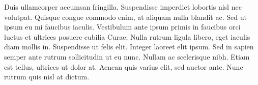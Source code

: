 \documentclass[11pt]{awe-homework}
\begin{document}
Duis ullamcorper accumsan fringilla. Suspendisse imperdiet lobortis nisl nec volutpat. Quisque congue commodo enim, at aliquam nulla blandit ac. Sed ut ipsum eu mi faucibus iaculis. Vestibulum ante ipsum primis in faucibus orci luctus et ultrices posuere cubilia Curae; Nulla rutrum ligula libero, eget iaculis diam mollis in. Suspendisse ut felis elit. Integer laoreet elit ipsum. Sed in sapien semper ante rutrum sollicitudin ut eu nunc. Nullam ac scelerisque nibh. Etiam est tellus, ultrices ut dolor at. Aenean quis varius elit, sed auctor ante. Nunc rutrum quis nisl at dictum.

\pagebreak

\end{document}
